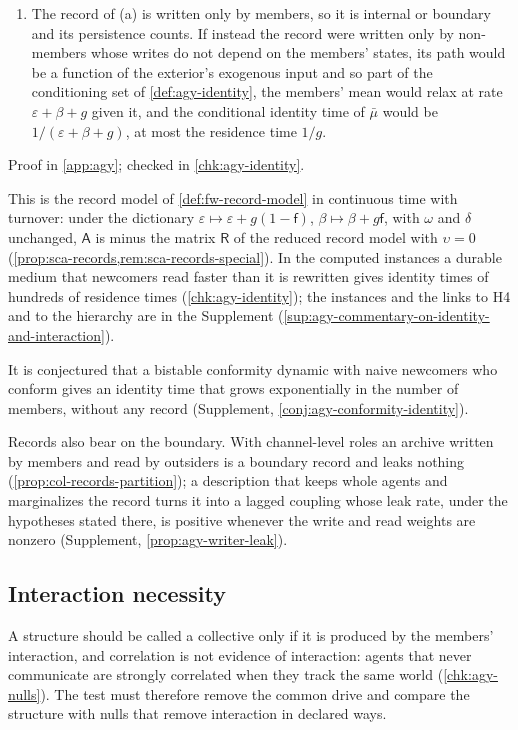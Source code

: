 \begin{proposition}
\begin{enumerate}
\item[(b)] The record of (a) is written only by members, so it is internal or boundary and its persistence counts. If instead the record were written only by non-members whose writes do not depend on the members' states, its path would be a function of the exterior's exogenous input and so part of the conditioning set of \cref{def:agy-identity}, the members' mean would relax at rate $\varepsilon+\beta+g$ given it, and the conditional identity time of $\bar\mu$ would be $1/(\varepsilon+\beta+g)$, at most the residence time $1/g$.
\end{enumerate}
Proof in \cref{app:agy}; checked in \cref{chk:agy-identity}.
\end{proposition}

This is the record model of \cref{def:fw-record-model} in continuous time with turnover: under the dictionary $\varepsilon\mapsto\varepsilon+g(1-\mathsf f)$, $\beta\mapsto\beta+g\mathsf f$, with $\omega$ and $\delta$ unchanged, $\mathsf A$ is minus the matrix $\mathsf R$ of the reduced record model with $\upsilon=0$ (\cref{prop:sca-records,rem:sca-records-special}). In the computed instances a durable medium that newcomers read faster than it is rewritten gives identity times of hundreds of residence times (\cref{chk:agy-identity}); the instances and the links to H4 and to the hierarchy are in the Supplement (\cref{sup:agy-commentary-on-identity-and-interaction}).

It is conjectured that a bistable conformity dynamic with naive newcomers who conform gives an identity time that grows exponentially in the number of members, without any record (Supplement, \cref{conj:agy-conformity-identity}).

Records also bear on the boundary. With channel-level roles an archive written by members and read by outsiders is a boundary record and leaks nothing (\cref{prop:col-records-partition}); a description that keeps whole agents and marginalizes the record turns it into a lagged coupling whose leak rate, under the hypotheses stated there, is positive whenever the write and read weights are nonzero (Supplement, \cref{prop:agy-writer-leak}).

\subsection{Interaction necessity}\label{sec:agy-interaction}

A structure should be called a collective only if it is produced by the members' interaction, and correlation is not evidence of interaction: agents that never communicate are strongly correlated when they track the same world (\cref{chk:agy-nulls}). The test must therefore remove the common drive and compare the structure with nulls that remove interaction in declared ways.

